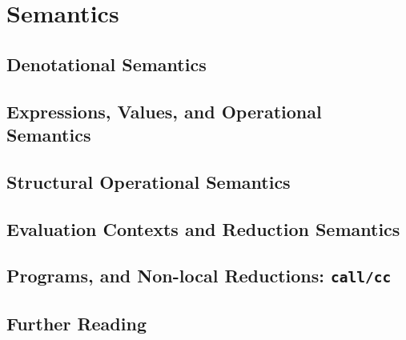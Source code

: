 \chapter{Semantics}

\section{Denotational Semantics}

\section{Expressions, Values, and Operational Semantics}

\section{Structural Operational Semantics}

\section{Evaluation Contexts and Reduction Semantics}

\section{Programs, and Non-local Reductions: \texttt{call/cc}}

\section{Further Reading}
